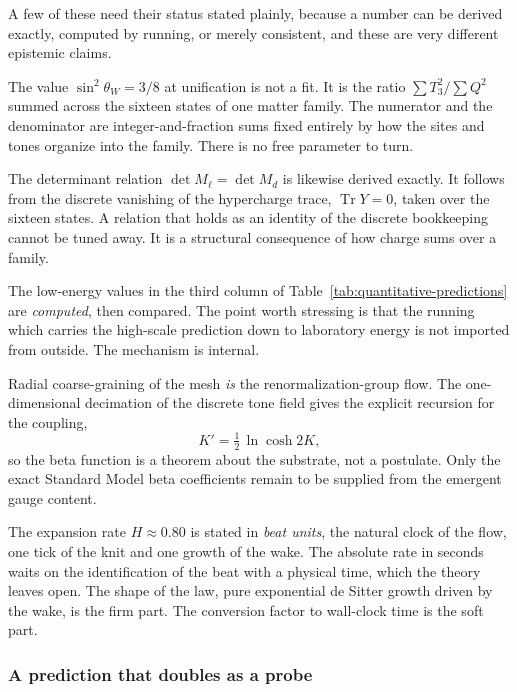A few of these need their status stated plainly, because a number can be derived exactly, computed by running, or merely consistent, and these are very different epistemic claims.

\begin{principle}
The value $\sin^2\theta_W = 3/8$ at unification is not a fit. It is the ratio $\sum T_3^2 \big/ \sum Q^2$ summed across the sixteen states of one matter family. The numerator and the denominator are integer-and-fraction sums fixed entirely by how the sites and tones organize into the family. There is no free parameter to turn.
\end{principle}

The determinant relation $\det M_{\ell} = \det M_{d}$ is likewise derived exactly. It follows from the discrete vanishing of the hypercharge trace, $\operatorname{Tr} Y = 0$, taken over the sixteen states. A relation that holds as an identity of the discrete bookkeeping cannot be tuned away. It is a structural consequence of how charge sums over a family.

The low-energy values in the third column of Table~\ref{tab:quantitative-predictions} are \emph{computed}, then compared. The point worth stressing is that the running which carries the high-scale prediction down to laboratory energy is not imported from outside. The mechanism is internal.

\begin{result}
Radial coarse-graining of the mesh \emph{is} the renormalization-group flow. The one-dimensional decimation of the discrete tone field gives the explicit recursion for the coupling,
\[
K' = \tfrac{1}{2}\,\ln\cosh 2K ,
\]
so the beta function is a theorem about the substrate, not a postulate. Only the exact Standard Model beta coefficients remain to be supplied from the emergent gauge content.
\end{result}

The expansion rate $H \approx 0.80$ is stated in \emph{beat units}, the natural clock of the flow, one tick of the knit and one growth of the wake. The absolute rate in seconds waits on the identification of the beat with a physical time, which the theory leaves open. The shape of the law, pure exponential de Sitter growth driven by the wake, is the firm part. The conversion factor to wall-clock time is the soft part.

\subsubsection{A prediction that doubles as a probe}

